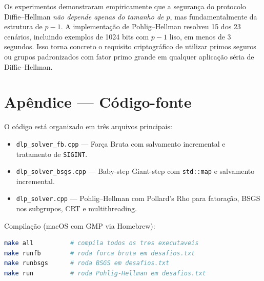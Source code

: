 \documentclass[conference, onecolumn]{IEEEtran}
\begin{document}
Os experimentos demonstraram empiricamente que a segurança do protocolo Diffie--Hellman
\emph{não depende apenas do tamanho de $p$}, mas fundamentalmente da estrutura de $p-1$.
A implementação de Pohlig--Hellman resolveu 15 dos 23 cenários, incluindo exemplos de
1024 bits com $p-1$ liso, em menos de 3 segundos. Isso torna concreto o requisito
criptográfico de utilizar primos seguros ou grupos padronizados com fator primo grande
em qualquer aplicação séria de Diffie--Hellman.

\appendix
\section*{Apêndice — Código-fonte}

O código está organizado em três arquivos principais:

\begin{itemize}
    \item \texttt{dlp\_solver\_fb.cpp} --- Força Bruta com salvamento incremental e
          tratamento de \texttt{SIGINT}.
    \item \texttt{dlp\_solver\_bsgs.cpp} --- Baby-step Giant-step com \texttt{std::map}
          e salvamento incremental.
    \item \texttt{dlp\_solver.cpp} --- Pohlig--Hellman com Pollard's Rho para fatoração,
          BSGS nos subgrupos, CRT e multithreading.
\end{itemize}

Compilação (macOS com GMP via Homebrew):
\begin{lstlisting}[language=bash, numbers=none]
make all          # compila todos os tres executaveis
make runfb        # roda forca bruta em desafios.txt
make runbsgs      # roda BSGS em desafios.txt
make run          # roda Pohlig-Hellman em desafios.txt
\end{lstlisting}
\end{document}
